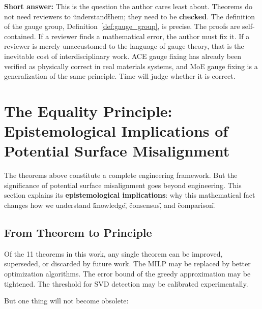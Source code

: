 \documentclass[12pt,a4paper]{article}
\theoremstyle{remark}
\begin{document}
\textbf{Short answer:} This is the question the author cares least about. Theorems do not need reviewers to \"understand\" them; they need to be \textbf{checked}. The definition of the gauge group, Definition~\ref{def:gauge_group}, is precise. The proofs are self-contained. If a reviewer finds a mathematical error, the author must fix it. If a reviewer is merely unaccustomed to the language of gauge theory, that is the inevitable cost of interdisciplinary work. ACE gauge fixing has already been verified as physically correct in real materials systems, and MoE gauge fixing is a generalization of the same principle. Time will judge whether it is correct.

\section{The Equality Principle: Epistemological Implications of Potential Surface Misalignment}

The theorems above constitute a complete engineering framework. But the significance of potential surface misalignment goes beyond engineering. This section explains its \textbf{epistemological implications}: why this mathematical fact changes how we understand \"knowledge\", \"consensus\", and \"comparison\".

\subsection{From Theorem to Principle}

Of the 11 theorems in this work, any single theorem can be improved, superseded, or discarded by future work. The MILP may be replaced by better optimization algorithms. The error bound of the greedy approximation may be tightened. The threshold for SVD detection may be calibrated experimentally.

But one thing will not become obsolete:

\begin{center}
\end{center}
\end{document}
